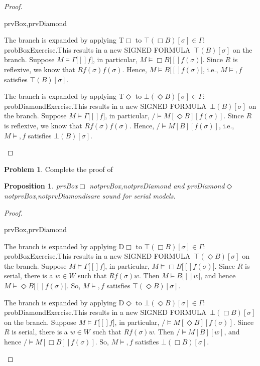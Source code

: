 \documentclass[10pt,a4paper]{article}
\makeatletter
\newcommand*{\olup}[1]{\MakeUppercase{#1}}
\theoremstyle{plain}
\newtheorem{prop}[thm]{Proposition}
\theoremstyle{definition}
\newtheorem{prob}{Problem}[section]
\theoremstyle{remark}
\newcommand*{\ollabel}[1]{\label{#1}}
\newcommand{\olref}{\@ifnextchar[{\olref@i}{\olref@final}}
\def\olref@i[#1]{\@ifnextchar[{\olref@ii}{\olref@final}}
\def\olref@ii[#1]{\@ifnextchar[{\olref@iii}{\olref@final}}
\def\olref@iii[#1]{\olref@final}
\def\olref@final#1{\ref{#1}}
\providecommand{\sFmla}[2]{#1(#2)}
\providecommand{\True}{\top}
\providecommand{\False}{\bot}
\providecommand{\mSat}[3]{\ensuremath{#1 \models #2[#3]}}
\providecommand{\mModel}[2]{\ensuremath{#1 \models #2}}
\providecommand{\iftag}[1]{#1}
\providecommand{\tagitem}[1]{\item[#1]}
\providecommand{\Ax}{\mathrm{Ax}}
\providecommand{\iftag}{}
\makeatother
\begin{document}
\begin{proof}
\begin{tagenumerate}{prvBox,prvDiamond}
\tagitem{prvBox}{The branch is expanded by applying T$\Box$ to
  $\sFmla{\True}{\Box B}[\sigma] \in \Gamma$:
  \iftag{probBox}{Exercise.}{This results in a new \olup{signed
      formula}~$\sFmla{\True}{B}[\sigma]$ on the branch. Suppose
    $\mSat{M}{\Gamma}[f]$, in particular, $\mSat{M}{\Box
      B}[f(\sigma)]$. Since $R$ is reflexive, we know that
    $Rf(\sigma)f(\sigma)$.  Hence, $\mSat{M}{B}[f(\sigma)]$, i.e.,
    $\mModel{M}, f$ satisfies $\sFmla{\True}{B}[\sigma]$.}}{}
\tagitem{prvDiamond}{The branch is expanded by applying T$\Diamond$ to
  $\sFmla{\False}{\Diamond B}[\sigma] \in \Gamma$:
  \iftag{probDiamond}{Exercise.}{This results in a new \olup{signed
      formula}~$\sFmla{\False}{B}[\sigma]$ on the branch. Suppose
    $\mSat{M}{\Gamma}[f]$, in particular, $\mSat/{M}{\Diamond
      B}[f(\sigma)]$. Since $R$ is reflexive, we know that
    $Rf(\sigma)f(\sigma)$.  Hence, $\mSat/{M}{B}[f(\sigma)]$, i.e.,
    $\mModel{M}, f$ satisfies $\sFmla{\False}{B}[\sigma]$.}}{}
\end{tagenumerate}
\end{proof}

\begin{prob}
  Complete the proof of \olref[nml][tab][msn]{prop:soundness-T}
\end{prob}
\tagendprob

\begin{prop}
  \ollabel{prop:soundness-D} 
  \iftag{prvBox}{\Ax{D}$\Box$}{}%
  \iftag{notprvBox,notprvDiamond}{}{ and }%
  \iftag{prvDiamond}{\Ax{D}$\Diamond$}{}
  \iftag{notprvBox,notprvDiamond}{is}{are}
  sound for serial models.
\end{prop}

\begin{proof}
\begin{tagenumerate}{prvBox,prvDiamond}
\tagitem{prvBox}{The branch is expanded by applying D$\Box$ to
  $\sFmla{\True}{\Box B}[\sigma] \in \Gamma$:
  \iftag{probBox}{Exercise.}{This results in a new \olup{signed
      formula}~$\sFmla{\True}{\Diamond B}[\sigma]$ on the
    branch. Suppose $\mSat{M}{\Gamma}[f]$, in particular,
    $\mSat{M}{\Box B}[f(\sigma)]$. Since $R$ is serial, there is a $w
    \in W$ such that $Rf(\sigma)w$. Then $\mSat{M}{B}[w]$, and hence
    $\mSat{M}{\Diamond B}[f(\sigma)]$.  So, $\mModel{M}, f$
    satisfies $\sFmla{\True}{\Diamond B}[\sigma]$.}}{}
\tagitem{prvDiamond}{The branch is expanded by applying D$\Diamond$ to
  $\sFmla{\False}{\Diamond B}[\sigma] \in \Gamma$:
  \iftag{probDiamond}{Exercise.}{This results in a new \olup{signed
      formula}~$\sFmla{\False}{\Box B}[\sigma]$ on the
    branch. Suppose $\mSat{M}{\Gamma}[f]$, in particular,
    $\mSat/{M}{\Diamond B}[f(\sigma)]$. Since $R$ is serial, there is a $w
    \in W$ such that $Rf(\sigma)w$. Then $\mSat/{M}{B}[w]$, and hence
    $\mSat/{M}{\Box B}[f(\sigma)]$.  So, $\mModel{M}, f$
    satisfies $\sFmla{\False}{\Box B}[\sigma]$.}}{}
\end{tagenumerate}
\end{proof}
\end{document}
